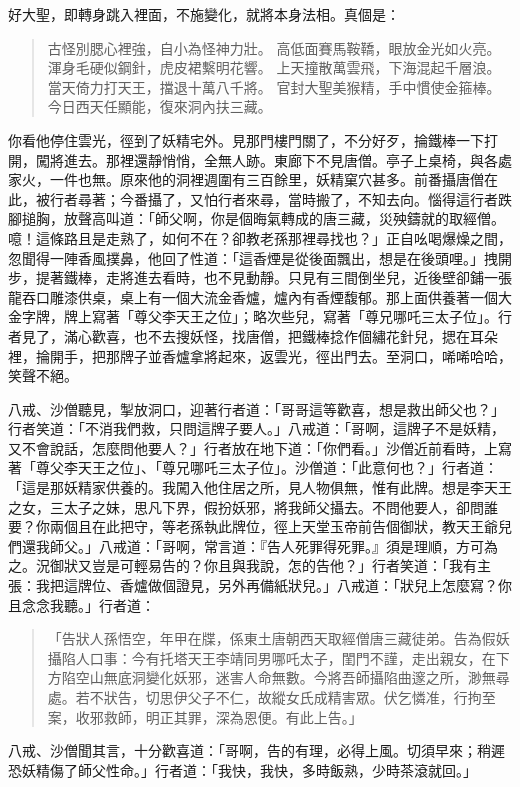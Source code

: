 好大聖，即轉身跳入裡面，不施變化，就將本身法相。真個是：
\begin{quote}
古怪別腮心裡強，自小為怪神力壯。
高低面賽馬鞍鞽，眼放金光如火亮。
渾身毛硬似鋼針，虎皮裙繫明花響。
上天撞散萬雲飛，下海混起千層浪。
當天倚力打天王，擋退十萬八千將。
官封大聖美猴精，手中慣使金箍棒。
今日西天任顯能，復來洞內扶三藏。
\end{quote}

你看他停住雲光，徑到了妖精宅外。見那門樓門關了，不分好歹，掄鐵棒一下打開，闖將進去。那裡還靜悄悄，全無人跡。東廊下不見唐僧。亭子上桌椅，與各處家火，一件也無。原來他的洞裡週圍有三百餘里，妖精窠穴甚多。前番攝唐僧在此，被行者尋著；今番攝了，又怕行者來尋，當時搬了，不知去向。惱得這行者跌腳搥胸，放聲高叫道：「師父啊，你是個晦氣轉成的唐三藏，災殃鑄就的取經僧。噫！這條路且是走熟了，如何不在？卻教老孫那裡尋找也？」正自吆喝爆燥之間，忽聞得一陣香風撲鼻，他回了性道：「這香煙是從後面飄出，想是在後頭哩。」拽開步，提著鐵棒，走將進去看時，也不見動靜。只見有三間倒坐兒，近後壁卻鋪一張龍吞口雕漆供桌，桌上有一個大流金香爐，爐內有香煙馥郁。那上面供養著一個大金字牌，牌上寫著「尊父李天王之位」；略次些兒，寫著「尊兄哪吒三太子位」。行者見了，滿心歡喜，也不去搜妖怪，找唐僧，把鐵棒捻作個繡花針兒，揌在耳朵裡，掄開手，把那牌子並香爐拿將起來，返雲光，徑出門去。至洞口，唏唏哈哈，笑聲不絕。

八戒、沙僧聽見，掣放洞口，迎著行者道：「哥哥這等歡喜，想是救出師父也？」行者笑道：「不消我們救，只問這牌子要人。」八戒道：「哥啊，這牌子不是妖精，又不會說話，怎麼問他要人？」行者放在地下道：「你們看。」沙僧近前看時，上寫著「尊父李天王之位」、「尊兄哪吒三太子位」。沙僧道：「此意何也？」行者道：「這是那妖精家供養的。我闖入他住居之所，見人物俱無，惟有此牌。想是李天王之女，三太子之妹，思凡下界，假扮妖邪，將我師父攝去。不問他要人，卻問誰要？你兩個且在此把守，等老孫執此牌位，徑上天堂玉帝前告個御狀，教天王爺兒們還我師父。」八戒道：「哥啊，常言道：『告人死罪得死罪。』須是理順，方可為之。況御狀又豈是可輕易告的？你且與我說，怎的告他？」行者笑道：「我有主張：我把這牌位、香爐做個證見，另外再備紙狀兒。」八戒道：「狀兒上怎麼寫？你且念念我聽。」行者道：
\begin{quote}
「告狀人孫悟空，年甲在牒，係東土唐朝西天取經僧唐三藏徒弟。告為假妖攝陷人口事：今有托塔天王李靖同男哪吒太子，閨門不謹，走出親女，在下方陷空山無底洞變化妖邪，迷害人命無數。今將吾師攝陷曲邃之所，渺無尋處。若不狀告，切思伊父子不仁，故縱女氏成精害眾。伏乞憐准，行拘至案，收邪救師，明正其罪，深為恩便。有此上告。」
\end{quote}

八戒、沙僧聞其言，十分歡喜道：「哥啊，告的有理，必得上風。切須早來；稍遲恐妖精傷了師父性命。」行者道：「我快，我快，多時飯熟，少時茶滾就回。」

